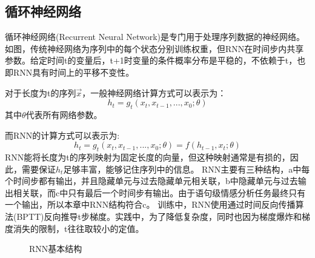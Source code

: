 \subsection{循环神经网络}
循环神经网络(Recurrent Neural Network)是专门用于处理序列数据的神经网络。如图，传统神经网络为序列中的每个状态分别训练权重，但RNN在时间步内共享参数。给定时间t的变量后，t+1时变量的条件概率分布是平稳的，不依赖于t，也即RNN具有时间上的平移不变性。\par
对于长度为{t}的序列$\vec{x}$，一般神经网络计算方式可以表示为：
\begin{equation}
h_t = g_t(x_t, x_{t-1},...,x_0;\theta)
\end{equation}
其中$\theta$代表所有网络参数。\par
而RNN的计算方式可以表示为:
\begin{equation}
h_t = g_t(x_t, x_{t-1},...,x_0;\theta) = f(h_{t-1}, x_t;\theta)
\end{equation}
RNN能将长度为t的序列映射为固定长度的向量，但这种映射通常是有损的，因此，需要保证$h_t$足够丰富，能够记住序列中的信息。
RNN主要有三种结构，a中每个时间步都有输出，并且隐藏单元与过去隐藏单元相关联，b中隐藏单元与过去输出相关联，而c中只有最后一个时间步有输出。由于语句级情感分析任务最终只有一个输出，所以本章中RNN结构符合c。
训练中，RNN使用通过时间反向传播算法(BPTT)反向推导t步梯度。实践中，为了降低复杂度，同时也因为梯度爆炸和梯度消失的限制，t往往取较小的定值。
\begin{center}
\begin{figure}
\caption{RNN基本结构}
\end{figure}
\end{center}

